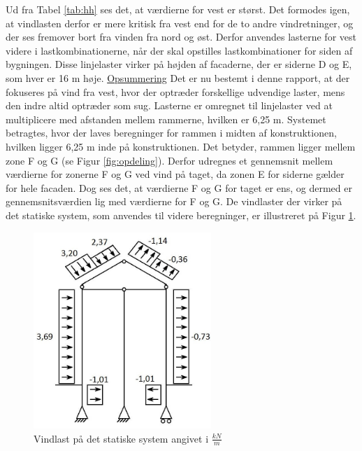 Ud fra Tabel \ref{tab:hh} ses det, at værdierne for vest er størst. Det formodes igen, at vindlasten derfor er mere kritisk fra vest end for de to andre vindretninger, og der ses fremover bort fra vinden fra nord og øst. Derfor anvendes lasterne for vest videre i lastkombinationerne, når der skal opstilles lastkombinationer for siden af bygningen.
\newline \indent{     }  Disse linjelaster virker på højden af facaderne, der er siderne D og E, som hver er 16 m høje.
\newline
\newline
\underline{Opsummering}
\newline
Det er nu bestemt i denne rapport, at der fokuseres på vind fra vest, hvor der optræder forskellige udvendige laster, mens den indre altid optræder som sug. Lasterne er omregnet til linjelaster ved at multiplicere med afstanden mellem rammerne, hvilken er 6,25 m. 
\newline
\newline
Systemet betragtes, hvor der laves beregninger for rammen i midten af konstruktionen, hvilken ligger 6,25 m inde på konstruktionen. Det betyder, rammen ligger mellem zone F og G (se Figur \ref{fig:opdeling}). Derfor udregnes et gennemsnit mellem værdierne for zonerne F og G ved vind på taget, da zonen E for siderne gælder for hele facaden. 
Dog ses det, at værdierne F og G for taget er ens, og dermed er gennemsnitsværdien lig med værdierne for F og G. 
\newline \indent{     }  De vindlaster der virker på det statiske system, som anvendes til videre beregninger, er illustreret på Figur \ref{fig:vindlast}. 

\begin{figure}[htbp]
	\centering
	\includegraphics[width=0.6\textwidth]{billeder/vindlast.png}
	\caption{Vindlast på det statiske system angivet i $\frac{kN}{m}$}
	\label{fig:vindlast}
\end{figure}


